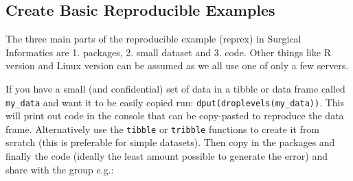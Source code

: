 \documentclass[
]{book}
\newenvironment{Shaded}{\begin{snugshade}}{\end{snugshade}}
\newcommand{\CommentTok}[1]{\textcolor[rgb]{0.56,0.35,0.01}{\textit{#1}}}
\newcommand{\DataTypeTok}[1]{\textcolor[rgb]{0.13,0.29,0.53}{#1}}
\newcommand{\DecValTok}[1]{\textcolor[rgb]{0.00,0.00,0.81}{#1}}
\newcommand{\KeywordTok}[1]{\textcolor[rgb]{0.13,0.29,0.53}{\textbf{#1}}}
\newcommand{\NormalTok}[1]{#1}
\newcommand{\OperatorTok}[1]{\textcolor[rgb]{0.81,0.36,0.00}{\textbf{#1}}}
\newcommand{\OtherTok}[1]{\textcolor[rgb]{0.56,0.35,0.01}{#1}}
\newcommand{\StringTok}[1]{\textcolor[rgb]{0.31,0.60,0.02}{#1}}
\begin{document}
\hypertarget{create-basic-reproducible-examples}{%
\subsection{Create Basic Reproducible Examples}\label{create-basic-reproducible-examples}}

The three main parts of the reproducible example (reprex) in Surgical Informatics are 1. packages, 2. small dataset and 3. code. Other things like R version and Linux version can be assumed as we all use one of only a few servers.

If you have a small (and confidential) set of data in a tibble or data frame called \texttt{my\_data} and want it to be easily copied run: \texttt{dput(droplevels(my\_data))}. This will print out code in the console that can be copy-pasted to reproduce the data frame. Alternatively use the \texttt{tibble} or \texttt{tribble} functions to create it from scratch (this is preferable for simple datasets). Then copy in the packages and finally the code (ideally the least amount possible to generate the error) and share with the group e.g.:

\begin{Shaded}
\end{Shaded}
\end{document}

